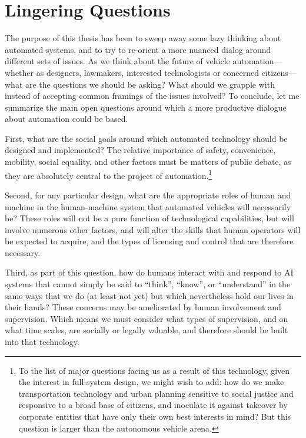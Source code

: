 \section{Lingering Questions}

The purpose of this thesis has been to sweep away some lazy thinking
about automated systems, and to try to re-orient a more nuanced dialog
around different sets of issues. As we think about the future of
vehicle automation---whether as
designers, lawmakers, interested technologists or concerned
citizens---what are the questions we should be asking? What should we
grapple with instead of accepting common framings of the issues
involved? To conclude, let me summarize the main open questions around
which a more productive dialogue about automation could be based.

First, what are the social goals around which automated technology
should be designed and implemented? The relative importance of safety,
convenience, mobility, social equality, and other factors must be
matters of public debate, as they are absolutely central to the
project of automation.\footnote{To the list
of major questions facing us as a result of this technology, given the
interest in full-system design, we might
wish to
add: how do we make transportation technology and urban planning sensitive to social
justice and responsive to a broad base of citizens, and inoculate it
against takeover by corporate entities that have only their own best interests
in mind? But this question is larger than the autonomous vehicle arena.}

Second, for any particular design, what are the appropriate roles of
human and machine in the human-machine system that automated vehicles
will necessarily be? These roles will not be a pure function of
technological capabilities, but will involve numerous other factors,
and will alter the skills that human operators will be expected to
acquire, and the types of licensing and control that are therefore
necessary. 

Third, as part of this question, how do humans interact with and
respond to AI systems that cannot simply be said to
``think'', ``know'', or ``understand'' in the same ways that we do (at
least not yet) but which nevertheless hold our lives in their hands?
These concerns may be ameliorated by human involvement and
supervision. Which means we must consider what types of supervision,
and on what time scales, are socially or legally valuable, and
therefore should be built into that technology. 

